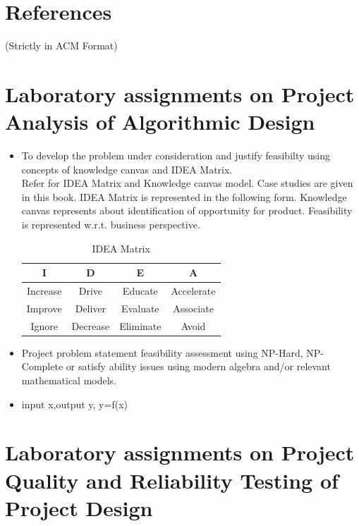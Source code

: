 \documentclass[12pt,a4paper]{article}
\begin{document}
\begin{appendices}

\section{References}
(Strictly in ACM Format)

\section{Laboratory assignments on Project Analysis of Algorithmic Design}
\begin{itemize}
\item To develop the problem under consideration and justify feasibilty using
concepts of knowledge canvas and IDEA Matrix.\\
Refer \cite{innovationbook} for IDEA Matrix and Knowledge canvas model. Case studies are given in this book. IDEA Matrix is represented in the following form. Knowledge canvas represents about identification  of opportunity for product. Feasibility is represented w.r.t. business perspective.\\ 

\begin{table}[!htbp]
\begin{center}
  \begin{tabular}{| c | c | c | c |}
\hline
 I & D & E & A \\ 
\hline
Increase & Drive & Educate & Accelerate \\
\hline
Improve & Deliver & Evaluate & Associate  \\
 \hline
Ignore & Decrease & Eliminate & Avoid \\
\hline
\end{tabular}
 \caption { IDEA Matrix }
 \label{tab:imatrix}
\end{center}
\end{table}

\item Project problem statement feasibility assessment using NP-Hard, NP-Complete or satisfy ability issues using modern algebra and/or relevant mathematical models.
\item input x,output y, y=f(x)
\end{itemize}

\section{Laboratory assignments on Project Quality and Reliability Testing of Project Design}


\end{appendices}
\end{document}
